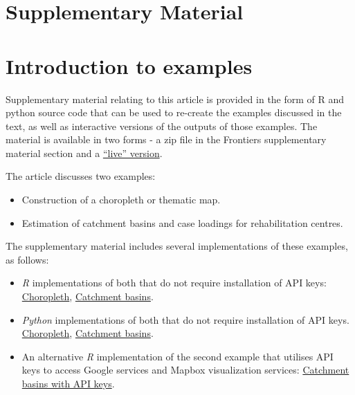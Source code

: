 \documentclass[utf8]{frontiers_suppmat} %
\begin{document}
\onecolumn
{}

\title[Supplementary Material]{{}}


\maketitle


\section{Supplementary Material}


\section{Introduction to examples}

Supplementary material relating to this article is provided in the
form of R and python source code that can be used to re-create the
examples discussed in the text, as well as interactive versions of the
outputs of those examples. The material is available in two forms - a
zip file in the Frontiers supplementary material section and a
\href{https://richardbeare.github.io/Geospatial/index.html}{``live''
  version}.


The article discusses two examples: 
\begin{itemize}
\item Construction of a choropleth or thematic map.
\item Estimation of catchment basins and case loadings for rehabilitation centres.
\end{itemize}

The supplementary material includes several implementations of these examples, as follows:

\begin{itemize}
\item {\em R} implementations of both that do not require installation of API keys: \href{https://richardbeare.github.io/GeospatialStroke/Choropleth/mmc_surrounds.html}{Choropleth}, \href{https://richardbeare.github.io/GeospatialStroke/RehabCatchment/README.html}{Catchment basins}.
\item {\em Python} implementations of both that do not require installation of API keys. \href{https://richardbeare.github.io/GeospatialStroke/python/notebooks/example1.html}{Choropleth}, \href{https://richardbeare.github.io/GeospatialStroke/python/notebooks/example2.html}{Catchment basins}.
\item An alternative {\em R} implementation of the second example that utilises API keys to access Google services and Mapbox visualization services: \href{https://richardbeare.github.io/GeospatialStroke/RehabCatchmentAdvances/Googleway_Mapdeck.html}{Catchment basins with API keys}.
\end{itemize}
\end{document}
